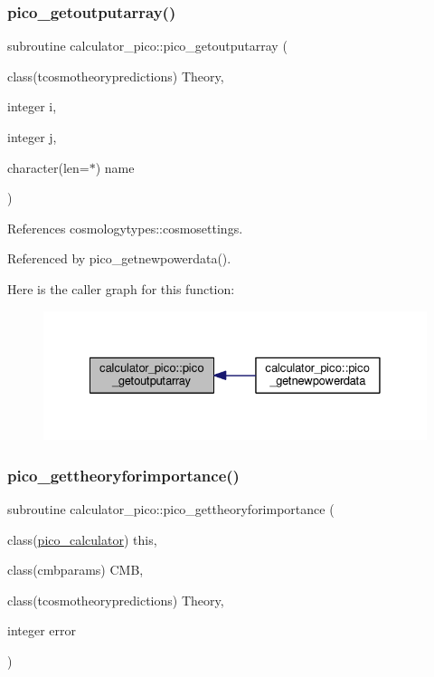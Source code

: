 \subsubsection{\texorpdfstring{pico\+\_\+getoutputarray()}{pico\_getoutputarray()}}
{\footnotesize\ttfamily subroutine calculator\+\_\+pico\+::pico\+\_\+getoutputarray (\begin{DoxyParamCaption}\item[{class(tcosmotheorypredictions)}]{Theory,  }\item[{integer}]{i,  }\item[{integer}]{j,  }\item[{character(len=$\ast$)}]{name }\end{DoxyParamCaption})\hspace{0.3cm}{\ttfamily [private]}}



References cosmologytypes\+::cosmosettings.



Referenced by pico\+\_\+getnewpowerdata().

Here is the caller graph for this function\+:
\nopagebreak
\begin{figure}[H]
\begin{center}
\leavevmode
\includegraphics[width=328pt]{namespacecalculator__pico_adaa7c5af46424e51b4ff7c68520348c2_icgraph}
\end{center}
\end{figure}
\mbox{\label{namespacecalculator__pico_abec990f2804cd52fd2f1c7aab45c7fe8}} 
\subsubsection{\texorpdfstring{pico\+\_\+gettheoryforimportance()}{pico\_gettheoryforimportance()}}
{\footnotesize\ttfamily subroutine calculator\+\_\+pico\+::pico\+\_\+gettheoryforimportance (\begin{DoxyParamCaption}\item[{class(\mbox{\hyperlink{structcalculator__pico_1_1pico__calculator}{pico\+\_\+calculator}})}]{this,  }\item[{class(cmbparams)}]{C\+MB,  }\item[{class(tcosmotheorypredictions)}]{Theory,  }\item[{integer}]{error }\end{DoxyParamCaption})}

